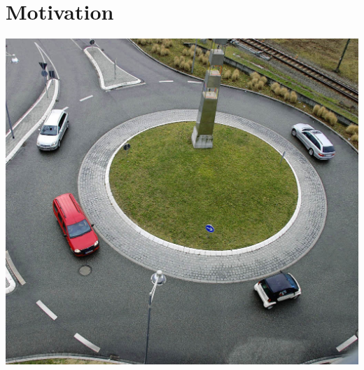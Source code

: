 \documentclass[nosymbols]{beamer}	%
\begin{document}
%
\addtocounter{framenumber}{-1}	%
\begin{frame}[plain]
	\titlepage
\end{frame}
%

	
\section{Motivation}

\begin{frame}
\begin{center}
 \includegraphics[width=\textwidth,height=0.7\textheight,keepaspectratio]{bilder/54467642.jpg} %
\end{center}
\end{frame}
\end{document}
